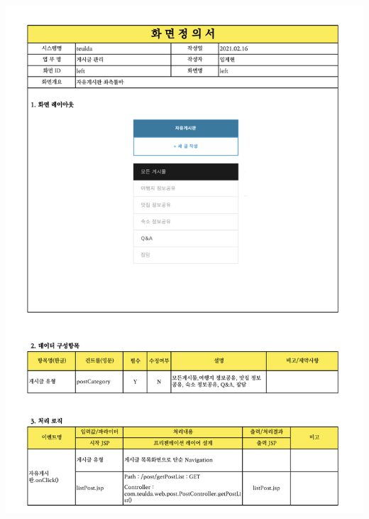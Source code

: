 {{{{{{{{{{{{{{{{{{{{{{{{{{{{{{{{{{{{{{{{{{{{{{{{{{{{{\includegraphics[width=19cm]{./Figure/Design/Display/post/post_01.pdf} \\
}}}}}}}}}}}}}}}}}}}}}}}}}}}}}}}}}}}}}}}}}}}}}}}}}}}}}
